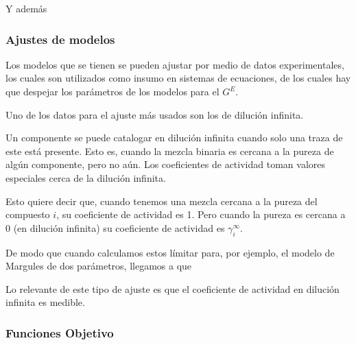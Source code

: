 
Y además

\subsubsection{Ajustes de modelos}

Los modelos que se tienen se pueden ajustar por medio de datos experimentales, los cuales son utilizados como insumo en sistemas de ecuaciones, de los cuales hay que despejar los parámetros de los modelos para el $G^{E}$.

Uno de los datos para el ajuste más usados son los de dilución infinita.


Un componente se puede catalogar en dilución infinita cuando solo una traza de este está presente. Esto es, cuando la mezcla binaria es 
cercana a la pureza de algún componente, pero no aún. Los coeficientes de actividad toman valores especiales cerca de la dilución infinita.


Esto quiere decir que, cuando tenemos una mezcla cercana a la pureza del compuesto $i$, su coeficiente de actividad es 1. Pero cuando la pureza es cercana a 0 (en dilución infinita) su coeficiente de actividad es $\gamma_i^{\infty}$.

De modo que cuando calculamos estos límitar para, por ejemplo, el modelo de Margules de dos parámetros, llegamos a que

Lo relevante de este tipo de ajuste es que el coeficiente de actividad en dilución infinita es medible.

\subsubsection{Funciones Objetivo}

